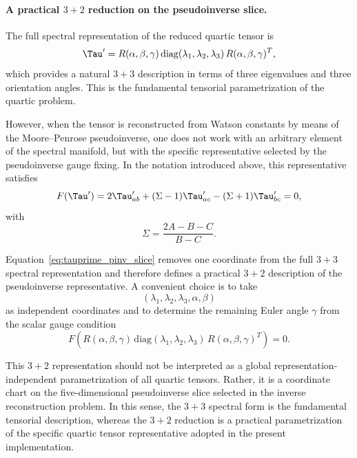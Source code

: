 \paragraph{A practical $3+2$ reduction on the pseudoinverse slice.}

The full spectral representation of the reduced quartic tensor is
\begin{equation}
\Tau' = R(\alpha,\beta,\gamma)\,
\mathrm{diag}(\lambda_1,\lambda_2,\lambda_3)\,
R(\alpha,\beta,\gamma)^T,
\label{eq:tauprime_spectral_3plus3}
\end{equation}
which provides a natural $3+3$ description in terms of three eigenvalues and
three orientation angles.  This is the fundamental tensorial
parametrization of the quartic problem.

However, when the tensor is reconstructed from Watson constants by means of the
Moore--Penrose pseudoinverse, one does not work with an arbitrary element of
the spectral manifold, but with the specific representative selected by the
pseudoinverse gauge fixing.  In the notation introduced above, this
representative satisfies
\begin{equation}
F(\Tau')=
2\Tau'_{ab}+(\Sigma-1)\Tau'_{ac}-(\Sigma+1)\Tau'_{bc}=0,
\label{eq:tauprime_pinv_slice}
\end{equation}
with
\begin{equation}
\Sigma=\frac{2A-B-C}{B-C}.
\end{equation}

Equation~\eqref{eq:tauprime_pinv_slice} removes one coordinate from the full
$3+3$ spectral representation and therefore defines a practical $3+2$
description of the pseudoinverse representative.  A convenient choice is to
take
\begin{equation}
(\lambda_1,\lambda_2,\lambda_3,\alpha,\beta)
\end{equation}
as independent coordinates and to determine the remaining Euler angle $\gamma$
from the scalar gauge condition
\begin{equation}
F\!\left(
R(\alpha,\beta,\gamma)\,
\mathrm{diag}(\lambda_1,\lambda_2,\lambda_3)\,
R(\alpha,\beta,\gamma)^T
\right)=0.
\label{eq:gamma_from_gauge}
\end{equation}

This $3+2$ representation should not be interpreted as a global
representation-independent parametrization of all quartic tensors.  Rather, it
is a coordinate chart on the five-dimensional pseudoinverse slice selected in
the inverse reconstruction problem.  In this sense, the $3+3$ spectral form is
the fundamental tensorial description, whereas the $3+2$ reduction is a
practical parametrization of the specific quartic tensor representative adopted
in the present implementation.
